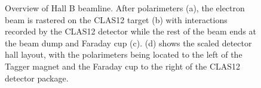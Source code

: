 \begin{figure}[ht]
\begin{minipage}[b]{\linewidth}
        \end{minipage}
        \caption[Hall B Beamline]{Overview of Hall B beamline. After \Moller polarimeters (a), the electron beam is rastered on the CLAS12 target (b) with interactions recorded by the CLAS12 detector while the rest of the beam ends at the beam dump and Faraday cup (c). (d) shows the scaled detector hall layout, with the \Moller polarimeters being located to the left of the Tagger magnet and the Faraday cup to the right of the CLAS12 detector package.}
        \label{fig:allfigures}
    \end{figure}

    \clearpage
